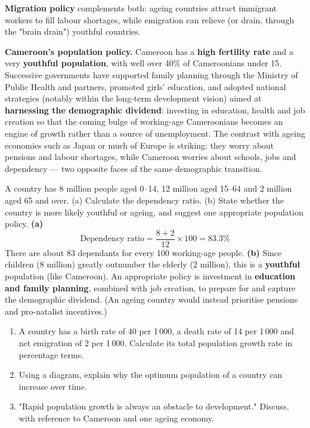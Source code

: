 \documentclass[11pt]{article}
\begin{document}
\textbf{Migration policy} complements both: ageing countries attract immigrant workers to fill labour shortages, while emigration can relieve (or drain, through the "brain drain") youthful countries.

\textbf{Cameroon's population policy.} Cameroon has a \textbf{high fertility rate} and a very \textbf{youthful population}, with well over 40\% of Cameroonians under 15. Successive governments have supported family planning through the Ministry of Public Health and partners, promoted girls' education, and adopted national strategies (notably within the long-term development vision) aimed at \textbf{harnessing the demographic dividend}: investing in education, health and job creation so that the coming bulge of working-age Cameroonians becomes an engine of growth rather than a source of unemployment. The contrast with ageing economies such as Japan or much of Europe is striking: they worry about pensions and labour shortages, while Cameroon worries about schools, jobs and dependency — two opposite faces of the same demographic transition.

\begin{exoresolu}
A country has 8 million people aged 0--14, 12 million aged 15--64 and 2 million aged 65 and over. (a) Calculate the dependency ratio. (b) State whether the country is more likely youthful or ageing, and suggest one appropriate population policy.
\tcblower
\textbf{(a)} 
\[ \text{Dependency ratio} = \frac{8 + 2}{12} \times 100 = 83.3\% \]
There are about 83 dependants for every 100 working-age people.
\textbf{(b)} Since children (8 million) greatly outnumber the elderly (2 million), this is a \textbf{youthful} population (like Cameroon). An appropriate policy is investment in \textbf{education and family planning}, combined with job creation, to prepare for and capture the demographic dividend. (An ageing country would instead prioritise pensions and pro-natalist incentives.)
\end{exoresolu}

\begin{exercice}[Practice]
\begin{enumerate}
\item A country has a birth rate of 40 per 1\,000, a death rate of 14 per 1\,000 and net emigration of 2 per 1\,000. Calculate its total population growth rate in percentage terms.
\item Using a diagram, explain why the optimum population of a country can increase over time.
\item "Rapid population growth is always an obstacle to development." Discuss, with reference to Cameroon and one ageing economy.
\end{enumerate}
\end{exercice}
\end{document}
